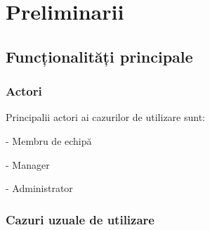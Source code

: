 \chapter{Preliminarii}

\section{Funcționalități principale}
\subsection{Actori}
Principalii actori ai cazurilor de utilizare sunt: 

- Membru de echipă

- Manager

- Administrator

\subsection{Cazuri uzuale de utilizare}
